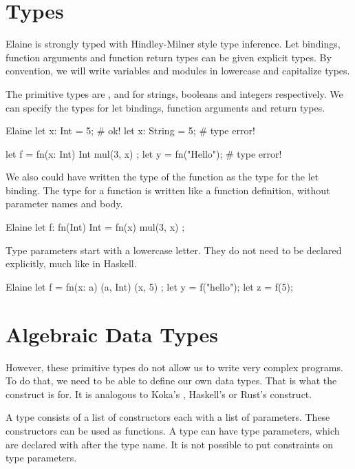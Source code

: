 \section{Types}

Elaine is strongly typed with Hindley-Milner style type inference. Let bindings, function arguments and function return types can be given explicit types. By convention, we will write variables and modules in lowercase and capitalize types.

The primitive types are ,  and  for strings, booleans and integers respectively. We can specify the types for let bindings, function arguments and return types.

\begin{lst}{Elaine}
let x: Int = 5;       # ok!
let x: String = 5;    # type error!

let f = fn(x: Int) Int { mul(3, x) };
let y = fn("Hello");  # type error!
\end{lst}

We also could have written the type of the function as the type for the let binding. The type for a function is written like a function definition, without parameter names and body.

\begin{lst}{Elaine}
let f: fn(Int) Int = fn(x) { mul(3, x) };
\end{lst}

Type parameters start with a lowercase letter. They do not need to be declared explicitly, much like in Haskell.

\begin{lst}{Elaine}
let f = fn(x: a) (a, Int) {
    (x, 5)
};
let y = f("hello");
let z = f(5);
\end{lst}

\section{Algebraic Data Types}

However, these primitive types do not allow us to write very complex programs. To do that, we need to be able to define our own data types. That is what the  construct is for. It is analogous to Koka's , Haskell's  or Rust's  construct.

A type consists of a list of constructors each with a list of parameters. These constructors can be used as functions. A type can have type parameters, which are declared with \el{[]} after the type name. It is not possible to put constraints on type parameters.

